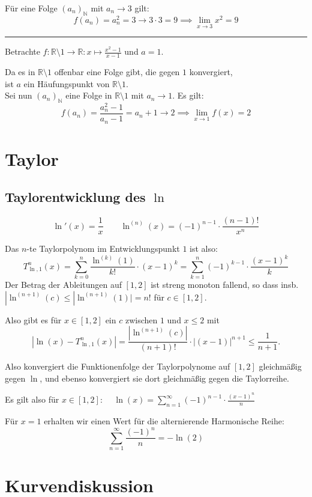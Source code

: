 \documentclass[10pt,a4paper]{article}
\begin{document}
\begin{multicols*}{2}
Für eine Folge $(a_n)_{\mathbb{N}}$ mit $a_n\to3$ gilt:
\[f(a_n)=a_n^2=3 \longrightarrow 3\cdot3=9 \implies \lim_{x\to3}x^2=9\]

\hrule\vspace{1em}

Betrachte $\displaystyle f: \mathbb{R}\setminus1\to\mathbb{R}:x\mapsto\frac{x^2-1}{x-1}$ und $a=1$.

Da es in $\mathbb{R}\setminus1$ offenbar eine Folge gibt, die gegen $1$ konvergiert,\\
ist $a$ ein Häufungspunkt von $\mathbb{R}\setminus1$.\\
Sei nun $(a_n)_{\mathbb{N}}$ eine Folge in $\mathbb{R}\setminus1$ mit $a_n\to1$. Es gilt:
\[f(a_n)=\frac{a_n^2-1}{a_n-1}=a_n+1\to2 \implies \lim_{x\to1}f(x)=2\]

\vfill\null
\columnbreak

\section*{Taylor}
\subsection*{Taylorentwicklung des $\ln$}
\[\ln'(x)=\frac{1}{x} \qquad \ln^{(n)}(x)=(-1)^{n-1}\cdot\frac{(n-1)!}{x^n}\]

Das $n$-te Taylorpolynom im Entwicklungspunkt $1$ ist also:
\[T_{\ln,1}^n(x)=\sum_{k=0}^n\frac{\ln^{(k)}(1)}{k!}\cdot(x-1)^k=\sum_{k=1}^n(-1)^{k-1}\cdot\frac{(x-1)^k}{k}\]
Der Betrag der Ableitungen auf $[1,2]$ ist streng monoton fallend, so dass insb. $|\ln^{(n+1)}(c)\le|\ln^{(n+1)}(1)|=n!$
für $c\in[1,2]$.

Also gibt es für $x\in[1,2]$ ein $c$ zwischen $1$ und $x\le2$ mit
\[|\ln(x)-T_{\ln,1}^n(x)|=\frac{|\ln^{(n+1)}(c)|}{(n+1)!}\cdot|(x-1)|^{n+1}\le\frac{1}{n+1}.\]

Also konvergiert die Funktionenfolge der Taylorpolynome auf $[1,2]$ gleichmäßig gegen $\ln$,
und ebenso konvergiert sie dort gleichmäßig gegen die Taylorreihe.

Es gilt also für $x\in[1,2]$: $\displaystyle \quad \ln(x)=\sum_{n=1}^\infty(-1)^{n-1}\cdot\frac{(x-1)^n}{n}$

Für $x=1$ erhalten wir einen Wert für die alternierende Harmonische Reihe:
\[\sum_{n=1}^\infty\frac{(-1)^n}{n}=-\ln(2)\]

\section*{Kurvendiskussion}


\end{multicols*}
\end{document}
